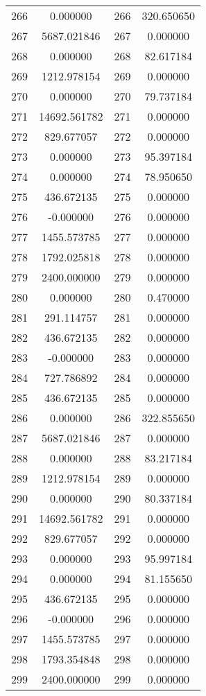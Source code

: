 \documentclass[12pt]{article}
\begin{document}
\begin{longtable}{@{}cccc@{}}
266 & 0.000000 & 266 & 320.650650 \\
267 & 5687.021846 & 267 & 0.000000 \\
268 & 0.000000 & 268 & 82.617184 \\
269 & 1212.978154 & 269 & 0.000000 \\
270 & 0.000000 & 270 & 79.737184 \\
271 & 14692.561782 & 271 & 0.000000 \\
272 & 829.677057 & 272 & 0.000000 \\
273 & 0.000000 & 273 & 95.397184 \\
274 & 0.000000 & 274 & 78.950650 \\
275 & 436.672135 & 275 & 0.000000 \\
276 & -0.000000 & 276 & 0.000000 \\
277 & 1455.573785 & 277 & 0.000000 \\
278 & 1792.025818 & 278 & 0.000000 \\
279 & 2400.000000 & 279 & 0.000000 \\
280 & 0.000000 & 280 & 0.470000 \\
281 & 291.114757 & 281 & 0.000000 \\
282 & 436.672135 & 282 & 0.000000 \\
283 & -0.000000 & 283 & 0.000000 \\
284 & 727.786892 & 284 & 0.000000 \\
285 & 436.672135 & 285 & 0.000000 \\
286 & 0.000000 & 286 & 322.855650 \\
287 & 5687.021846 & 287 & 0.000000 \\
288 & 0.000000 & 288 & 83.217184 \\
289 & 1212.978154 & 289 & 0.000000 \\
290 & 0.000000 & 290 & 80.337184 \\
291 & 14692.561782 & 291 & 0.000000 \\
292 & 829.677057 & 292 & 0.000000 \\
293 & 0.000000 & 293 & 95.997184 \\
294 & 0.000000 & 294 & 81.155650 \\
295 & 436.672135 & 295 & 0.000000 \\
296 & -0.000000 & 296 & 0.000000 \\
297 & 1455.573785 & 297 & 0.000000 \\
298 & 1793.354848 & 298 & 0.000000 \\
299 & 2400.000000 & 299 & 0.000000 \\

\end{longtable}
\end{document}
